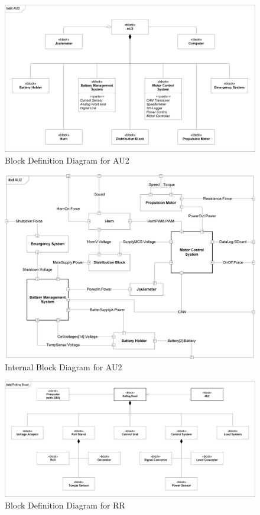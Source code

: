 \newpage
\begin{figure}[H]
	\centering
	\includegraphics[width=1\linewidth]{Architecture/BDD_AU2}
	\caption{Block Definition Diagram for AU2}
	\label{fig:BDD_AU2}
\end{figure}

\begin{figure}[H]
	\centering
	\includegraphics[width=1\linewidth]{Architecture/IBD_AU2}
	\caption{Internal Block Diagram for AU2}
	\label{fig:IBD_AU2}
\end{figure}

\begin{figure}[H]
	\centering
	\includegraphics[width=1\linewidth]{Architecture/BDD_RR}
	\caption{Block Definition Diagram for RR}
	\label{fig:BDD_RR}
\end{figure}

